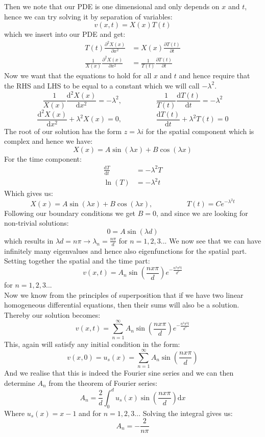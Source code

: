 \documentclass{article}
\newcommand{\beq}{\begin{equation}}
\newcommand{\eeq}{\end{equation}}
\begin{document}
Then we note that our PDE is one dimensional and only depends on $x$ and $t$, hence we can try solving it by separation of variables:
$$v(x,t) = X(x)T(t)$$ 
which we insert into our PDE and get:
\begin{align*}
T(t)\frac{\partial^2 X(x)}{\partial x^2} & = X(x) \frac{\partial T(t)}{\partial t}\\
\frac{1}{X(x)}\frac{\partial^2 X(x)}{\partial x^2} & = \frac{1}{T(t)} \frac{\partial T(t)}{\partial t}
\end{align*} 
Now we want that the equations to hold for all $x$ and $t$ and hence require that the RHS and LHS to be equal to a constant which we will call $-\lambda^2$. 
\beq
\frac{1}{X(x)}\frac{\text{d}^2 X(x)}{\text{d} x^2}  = -\lambda^2, \hspace{2cm} \frac{1}{T(t)} \frac{\text{d} T(t)}{\text{d} t} = -\lambda^2 \nonumber
\eeq
\beq
\frac{\text{d}^2 X(x)}{\text{d} x^2}  + \lambda^2X(x) = 0, \hspace{2cm} \frac{\text{d} T(t)}{\text{d} t} + \lambda^2T(t) = 0 \nonumber
\eeq
The root of our solution has the form $z = \lambda i$ for the spatial component which is complex and hence we have:
$$X(x) = A\sin(\lambda x) + B\cos(\lambda x)$$
For the time component:
\begin{align*}
\frac{\text{d}T}{\text{d} t} &= -\lambda^2 T \\
\ln(T) &= -\lambda^2t
\end{align*}
Which gives us:
\beq
X(x) = A\sin(\lambda x) + B\cos(\lambda x), \hspace{2cm} T(t) =  Ce^{-\lambda^2t}
\eeq
Following our boundary conditions we get $B=0$, and since we are looking for non-trivial solutions:
\beq
0 = A\sin(\lambda d) \nonumber
\eeq 
which results in $\lambda d = n\pi \rightarrow \lambda_n = \frac{n\pi}{d}$ for $n = 1,2,3...$
We now see that we can have infinitely many eigenvalues and hence also eigenfunctions for the spatial part. Setting together the spatial and the time part:
$$v(x,t) = A_n\sin(\frac{nx\pi}{d})e^{-\frac{n^2\pi^2t}{d^2}}$$
for $n=1,2,3...$\\
Now we know from the principles of superposition that if we have two linear homogeneous differential equations, then their sums will also be a solution.
Thereby our solution becomes:
\beq
v(x,t) = \sum_{n=1}^\infty A_n\sin(\frac{nx\pi}{d})e^{-\frac{n^2\pi^2t}{d^2}}
\eeq
This, again will satisfy any initial condition in the form:
$$v(x,0) = u_s(x) = \sum_{n=1}^\infty A_n\sin(\frac{nx\pi}{d})$$
And we realise that this is indeed the Fourier sine series and we can then determine $A_n$ from the theorem of Fourier series:
$$A_n = \frac{2}{d} \int_0^d u_s(x)\sin(\frac{nx\pi}{d})\text{d}x$$
Where $u_s(x) = x-1$ and for $n=1,2,3...$
Solving the integral gives us: $$A_n = -\frac{2}{n\pi}$$
\end{document}
